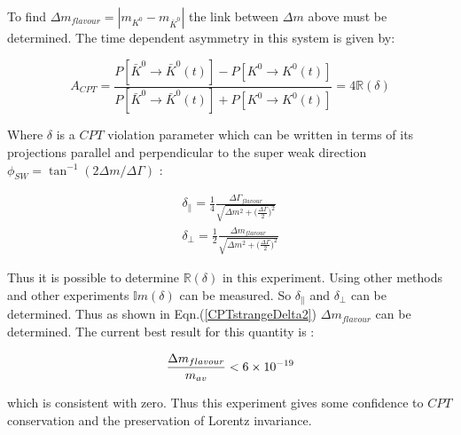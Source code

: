 To find ${\Delta m}_{flavour} = |m_{K^{0}} - m_{\bar{K}^{0}}|$ the link between $\Delta m$ above must be determined. The time dependent asymmetry in this system is given by:

\begin{equation*}
A_{CPT} = \frac{P[\bar{K}^{0} \rightarrow \bar{K}^{0}(t)] - P[{K}^{0} \rightarrow {K}^{0}(t)]}{P[\bar{K}^{0} \rightarrow \bar{K}^{0}(t)] + P[{K}^{0} \rightarrow {K}^{0}(t)]} = 4 \mathbb{R}({\delta})
\end{equation*}

\smallskip

\noindent Where $\delta$ is a $CPT$ violation parameter which can be written in terms of its projections parallel and perpendicular to the super weak direction $\phi_{SW} = \tan^{-1} (2 \Delta m / \Delta \Gamma)$ \cite{PDGKaons}:

\begin{align}
\label{CPTstrangeDelta1}
\delta_{\parallel} = \frac{1}{4} \frac{{\Delta \Gamma}_{flavour}}{\sqrt{\Delta m^{2} + \big(\frac{\Delta \Gamma}{2} \big)^{2}}} \\
\label{CPTstrangeDelta2}
\delta_{\perp} = \frac{1}{2} \frac{{\Delta m}_{flavour}}{\sqrt{\Delta m^{2} + \big(\frac{\Delta \Gamma}{2} \big)^{2}}}
\end{align}

Thus it is possible to determine $\mathbb{R}({\delta})$ in this experiment. Using other methods and other experiments $\mathbb{I}m({\delta})$ can be measured. So $\delta_{\parallel}$ and $\delta_{\perp}$ can be determined. Thus as shown in Eqn.(\ref{CPTstrangeDelta2}) $\Delta m_{flavour}$ can be determined. The current best result for this quantity is \cite{PDGKaons}: 

$$\frac{\Delta m_{flavour}}{m_{av}} < 6 \times 10^{-19}$$ 

\noindent which is consistent with zero. Thus this experiment gives some confidence to $CPT$ conservation and the preservation of Lorentz invariance.      
  
  
  
  
